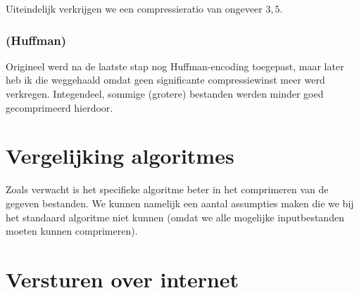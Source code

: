 \documentclass[a4paper]{article}
\begin{document}
Uiteindelijk verkrijgen we een compressieratio van ongeveer $3,5$.

\subsubsection{(Huffman)}
Origineel werd na de laatste stap nog Huffman-encoding toegepast, maar later heb ik die weggehaald omdat geen significante compressiewinst meer werd verkregen.
Integendeel, sommige (grotere) bestanden werden minder goed gecomprimeerd hierdoor.

\section{Vergelijking algoritmes}

Zoals verwacht is het specifieke algoritme beter in het comprimeren van de gegeven bestanden. We kunnen namelijk een aantal assumpties maken die we bij het standaard algoritme niet kunnen (omdat we alle mogelijke inputbestanden moeten kunnen comprimeren).

\section{Versturen over internet}


\begin{figure}[H]
\end{figure}
\end{document}
